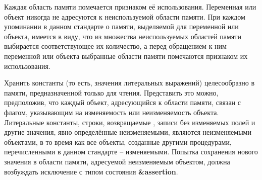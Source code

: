 Каждая область памяти помечается признаком её использования. Переменная или объект никогда
не адресуются к неиспользуемой области памяти. При каждом упоминании в данном стандарте о памяти,
выделяемой для переменной или объекта, имеется в виду, что из множества неиспользуемых областей
памяти выбирается соответствующее их количество, а перед обращением к ним переменной
или объекта выбранные области памяти помечаются признаком их использования.

Хранить константы (то есть, значения литеральных выражений) целесообразно в
памяти, предназначенной только для чтения. Представить это можно, предположив, что каждый объект,
адресующийся к области памяти, связан с флагом, указывающим на изменяемость или
неизменяемость объекта. Литеральные константы, строки, возвращаемые
{\bfseries{}}, записи без изменяемых полей и другие значения, явно
определённые неизменяемыми, являются неизменяемыми объектами, в то время как все объекты,
созданные другими процедурами, перечисленными в данном стандарте -- изменяемыми. Попытка сохранения
нового значения в области памяти, адресуемой неизменяемым объектом, должна возбуждать исключение с
типом состояния {\bfseries\cf\&assertion}.\vspace{-2.2mm}

